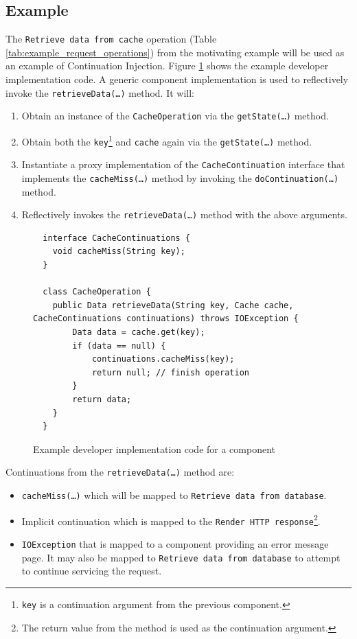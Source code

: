 \documentclass[prodmode]{style/acmlarge}
\begin{document}
\subsection{Example}

The \texttt{Retrieve data from cache} operation (Table
\ref{tab:example_request_operations}) from the motivating example will be used
as an example of Continuation Injection.  Figure
\ref{fig:Example_Method_Operation} shows the example developer implementation
code.  A generic component implementation is used to reflectively invoke the
\texttt{retrieveData(\ldots)} method. It will:
\begin{enumerate}
  \item Obtain an instance of the \texttt{CacheOperation} via the \texttt{getState(\ldots)} method.
  \item Obtain both the \texttt{key}\footnote{\texttt{key} is a continuation argument from the previous component.} and \texttt{cache} again via the \texttt{getState(\ldots)} method.
  \item Instantiate a proxy implementation of the \texttt{CacheContinuation} interface that implements the \texttt{cacheMiss(\ldots)} method by invoking the \texttt{doContinuation(\ldots)} method. 
  \item Reflectively invokes the \texttt{retrieveData(\ldots)} method with the above arguments.
\end{enumerate}

\begin{figure}[tp]
\centering
\begin{verbatim}
  interface CacheContinuations {
    void cacheMiss(String key);
  }

  class CacheOperation {    
    public Data retrieveData(String key, Cache cache, CacheContinuations continuations) throws IOException {
        Data data = cache.get(key);
        if (data == null) {
            continuations.cacheMiss(key);
            return null; // finish operation
        }
        return data;
    }
  }
\end{verbatim}
\caption{Example developer implementation code for a component\footnotemark}
\label{fig:Example_Method_Operation}
\end{figure}

Continuations from the \texttt{retrieveData(\ldots)} method are:
\begin{itemize}
  \item \texttt{cacheMiss(\ldots)} which will be mapped to \texttt{Retrieve data from database}.
  \item Implicit continuation which is mapped to the \texttt{Render HTTP response}\footnote{The return value from the method is used as the continuation argument.}.
  \item \texttt{IOException} that is mapped to a component providing an error message page.  It may also be mapped to \texttt{Retrieve data from database} to attempt to continue servicing the request.
\end{itemize}
\end{document}
